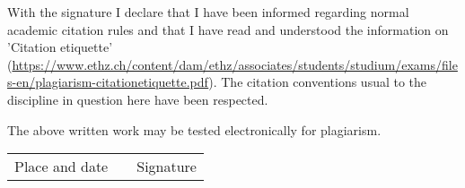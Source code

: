 \vspace{1cm}

With the signature I declare that I have been informed regarding normal academic citation rules and that I have read and understood the information on 'Citation etiquette' (\url{https://www.ethz.ch/content/dam/ethz/associates/students/studium/exams/files-en/plagiarism-citationetiquette.pdf}). The citation conventions usual to the discipline in question here have been respected.

\vspace{0.5cm}

The above written work may be tested electronically for plagiarism.

\vspace{4cm}

\begin{tabular}{ p{5cm} p{1cm} p{5cm} }
  \cline{1-1} \cline{3-3}
  Place and date & & Signature \\
\end{tabular}
